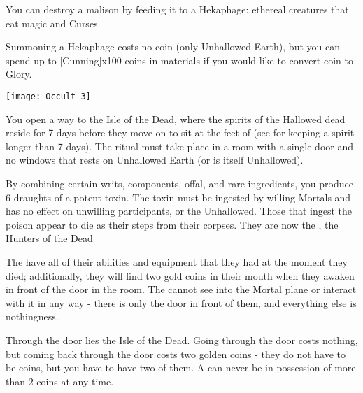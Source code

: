\OCCULT[
  Name=Hekaphage,
  Link=occultism-hekaphage,
  Success=4+,
  Cost=varies
]

You can destroy a malison by feeding it to a Hekaphage: ethereal creatures that eat magic and Curses.  


Summoning a Hekaphage costs no coin (only Unhallowed Earth), but you can spend up to [Cunning]x100 coins in materials if you would like to convert coin to Glory.

\cbreak

  \begin{center}
  \texttt{[image: Occult\_3]}
  \end{center}





\OCCULT[
  Name=Katabasis,
  Link=occultism-katabasis,
  Success=15,
  Cost=6{,}666\AU
]



You open a way to the Isle of the Dead, where the spirits of the Hallowed dead reside for 7 days before they move on to sit at the feet of \TheAuthority (see  for keeping a spirit longer than 7 days).  The ritual must take place in a room with a single door and no windows that rests on Unhallowed Earth (or is itself Unhallowed).

By combining certain writs, components, offal, and rare ingredients, you produce 6 draughts of a potent toxin. The toxin must be ingested by willing Mortals and has no effect on unwilling participants, or the Unhallowed.  Those that ingest the poison appear to die as their  steps from their corpses.  They are now the , the Hunters of the Dead

The  have all of their abilities and equipment that they had at the moment they died; additionally, they will find two gold coins in their mouth when they awaken in front of the door in the room. The  cannot see into the Mortal plane or interact with it in any way - there is only the door in front of them, and everything else is nothingness.

Through the door lies the Isle of the Dead.  Going through the door costs nothing, but coming back through the door costs two golden coins - they do not have to be  coins, but you have to have two of them.  A  can never be in possession of more than 2 coins at any time.

